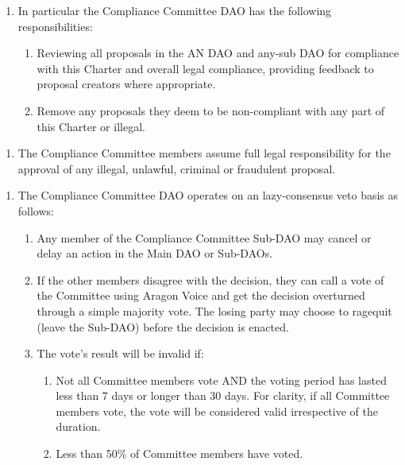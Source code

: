 \begin{enumerate}
\begin{enumerate}
	\end{enumerate}
	
	\begin{enumerate}
		
		\begin{enumerate}
			
			\item In particular the Compliance Committee \ac{DAO} has the following
			responsibilities:
			\begin{enumerate}
				\item Reviewing all proposals in the AN \ac{DAO} and any-sub \ac{DAO} for
				compliance with this Charter and overall legal compliance,
				providing feedback to proposal creators where appropriate.
				\item Remove any proposals they deem to be non-compliant with any
				part of this Charter or illegal.
			\end{enumerate}
		
		\end{enumerate}

		\begin{enumerate}
			\item The Compliance Committee members assume full legal responsibility for the approval of any illegal, unlawful, criminal or fraudulent proposal.
		\end{enumerate}
	
		\begin{enumerate}
			
			\item The Compliance Committee \ac{DAO} operates on an lazy-consensus veto basis as follows:
			\begin{enumerate}
				
				\item Any member of the Compliance Committee Sub-\ac{DAO} may cancel or delay an action in the Main \ac{DAO} or Sub-\acp{DAO}.
				\item If the other members disagree with the decision, they can call a vote of the Committee using Aragon Voice and get the decision overturned through a simple majority vote.
				The losing party may choose to ragequit (leave the Sub-\ac{DAO}) before the decision is enacted.
				\item The vote’s result will be invalid if:
				\begin{enumerate}
					\item Not all Committee members vote AND the voting period
					has lasted less than 7 days or longer than 30 days.
					For clarity, if all Committee members vote, the vote will be considered valid irrespective of the duration.
					\item Less than 50\% of Committee members have voted.
				\end{enumerate}
			

\end{enumerate}
\end{enumerate}
\end{enumerate}
\end{enumerate}
